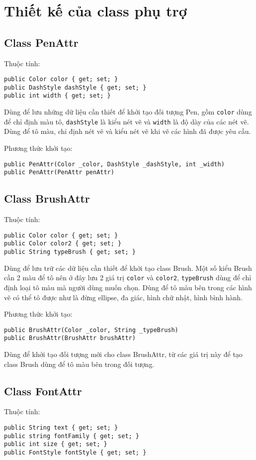 \documentclass[12pt]{article}
\begin{document}
\section{Thiết kế của class phụ trợ}
\subsection{Class PenAttr}
Thuộc tính:
\begin{lstlisting}
public Color color { get; set; }
public DashStyle dashStyle { get; set; }
public int width { get; set; }
\end{lstlisting}

Dùng để lưu những dữ liệu cần thiết để khởi tạo đối tượng Pen, gồm \texttt{color} dùng để chỉ định màu tô,
\texttt{dashStyle} là kiểu nét vẽ  và \texttt{width} là độ dày của các nét vẽ.
Dùng để tô màu, chỉ định nét vẽ và kiểu nét vẽ khi vẽ các hình đã được yêu cầu.

Phương thức khởi tạo:
\begin{lstlisting}
public PenAttr(Color _color, DashStyle _dashStyle, int _width)
public PenAttr(PenAttr penAttr)
\end{lstlisting}

\subsection{Class BrushAttr}
Thuộc tính:
\begin{lstlisting}
public Color color { get; set; }
public Color color2 { get; set; }
public String typeBrush { get; set; }
\end{lstlisting}

Dùng để lưu trữ các dữ liệu cần thiết để khởi tạo class Brush.
Một số kiểu Brush cần 2 màu để tô nên ở đây lưu 2 giá trị \texttt{color} và \texttt{color2},
\texttt{typeBrush} dùng để chỉ định loại tô màu mà người dùng muốn chọn.
Dùng để tô màu bên trong các hình vẽ có thể tô được như là đừng ellipse, đa giác, hình chữ nhật,  hình bình hành.

Phương thức khởi tạo:
\begin{lstlisting}
public BrushAttr(Color _color, String _typeBrush)
public BrushAttr(BrushAttr brushAttr)
\end{lstlisting}

Dùng để khởi tạo đối tượng mới cho class BrushAttr,
từ các giá trị này để tạo class Brush dùng để tô màu bên trong đối tượng.

\subsection{Class FontAttr}
Thuộc tính:
\begin{lstlisting}
public String text { get; set; }
public string fontFamily { get; set; }
public int size { get; set; }
public FontStyle fontStyle { get; set; }
\end{lstlisting}
\end{document}
